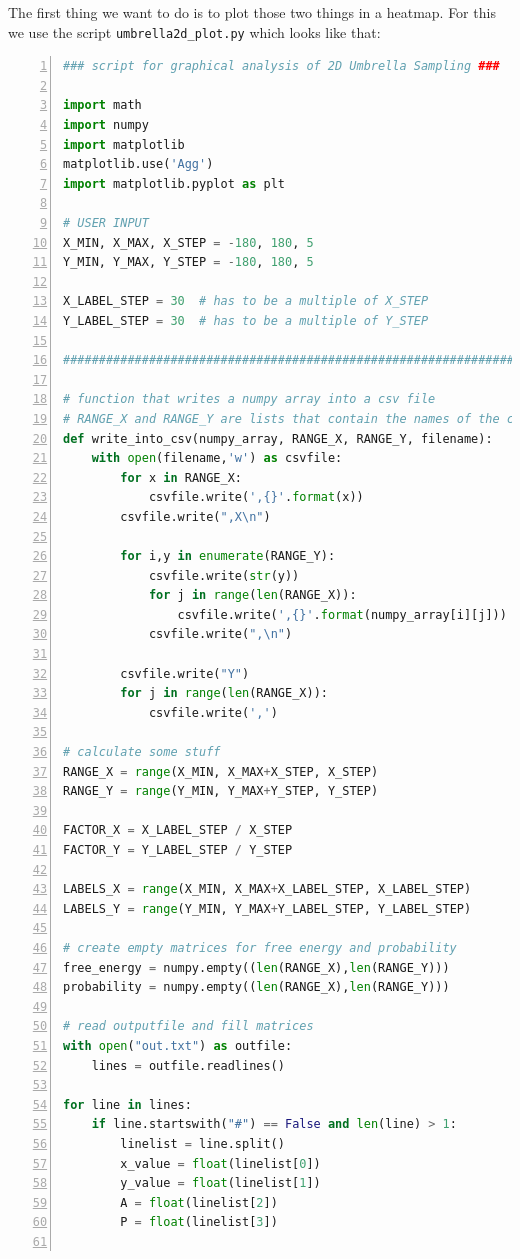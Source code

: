 \documentclass[a4paper,11pt]{scrartcl}
\begin{document}
The first thing we want to do is to plot those two things in a heatmap. For this we use the script \texttt{umbrella2d\_plot.py} which looks like that:
\begin{lstlisting}[frame=single,language=python,basicstyle=\footnotesize,commentstyle=\color{red},keywordstyle=\color{blue},stringstyle=\color{mygreen},numbers=left]
### script for graphical analysis of 2D Umbrella Sampling ###

import math
import numpy
import matplotlib
matplotlib.use('Agg')
import matplotlib.pyplot as plt

# USER INPUT
X_MIN, X_MAX, X_STEP = -180, 180, 5
Y_MIN, Y_MAX, Y_STEP = -180, 180, 5

X_LABEL_STEP = 30  # has to be a multiple of X_STEP
Y_LABEL_STEP = 30  # has to be a multiple of Y_STEP

######################################################################

# function that writes a numpy array into a csv file
# RANGE_X and RANGE_Y are lists that contain the names of the columns and rows
def write_into_csv(numpy_array, RANGE_X, RANGE_Y, filename):
    with open(filename,'w') as csvfile:
        for x in RANGE_X:
            csvfile.write(',{}'.format(x))
        csvfile.write(",X\n")

        for i,y in enumerate(RANGE_Y):
            csvfile.write(str(y))
            for j in range(len(RANGE_X)):
                csvfile.write(',{}'.format(numpy_array[i][j]))
            csvfile.write(",\n")
            
        csvfile.write("Y")
        for j in range(len(RANGE_X)):
            csvfile.write(',')

# calculate some stuff
RANGE_X = range(X_MIN, X_MAX+X_STEP, X_STEP)
RANGE_Y = range(Y_MIN, Y_MAX+Y_STEP, Y_STEP)

FACTOR_X = X_LABEL_STEP / X_STEP
FACTOR_Y = Y_LABEL_STEP / Y_STEP 

LABELS_X = range(X_MIN, X_MAX+X_LABEL_STEP, X_LABEL_STEP)
LABELS_Y = range(Y_MIN, Y_MAX+Y_LABEL_STEP, Y_LABEL_STEP)

# create empty matrices for free energy and probability
free_energy = numpy.empty((len(RANGE_X),len(RANGE_Y)))
probability = numpy.empty((len(RANGE_X),len(RANGE_Y)))

# read outputfile and fill matrices
with open("out.txt") as outfile:
    lines = outfile.readlines()

for line in lines:
    if line.startswith("#") == False and len(line) > 1:
        linelist = line.split()
        x_value = float(linelist[0])
        y_value = float(linelist[1])
        A = float(linelist[2])
        P = float(linelist[3])


\end{lstlisting}
\end{document}

